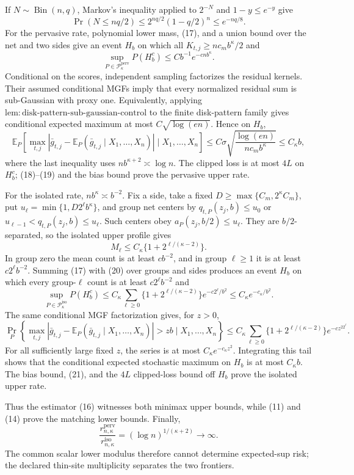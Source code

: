 If \(N\sim\operatorname{Bin}(n,q)\), Markov's inequality applied to \(2^{-N}\) and \(1-y\le e^{-y}\) give
\[
 \Pr(N\le nq/2)\le2^{nq/2}(1-q/2)^n\le e^{-nq/8}. \tag{17}
\]
For the pervasive rate, polynomial lower mass, (17), and a union bound over the net and two sides give an event \(H_b\) on which all \(K_{t,j}\ge nc_mb^\kappa/2\) and
\[
 \sup_{P\in\mathcal P_\kappa^{\mathrm{perv}}}P(H_b^c)
 \le Cb^{-1}e^{-cnb^\kappa}. \tag{18}
\]
Conditional on the scores, independent sampling factorizes the residual kernels.  Their assumed conditional MGFs imply that every normalized residual sum is sub-Gaussian with proxy one.  Equivalently, applying \(\mathrm{lem:disk\text{-}pattern\text{-}sub\text{-}gaussian\text{-}control}\) to the finite disk-pattern family gives conditional expected maximum at most \(C\sqrt{\log(en)}\).  Hence on \(H_b\),
\[
 \mathbb E_P\!\left[
 \max_{t,j}|\bar g_{t,j}-\mathbb E_P(\bar g_{t,j}\mid X_1,\ldots,X_n)|
 \mid X_1,\ldots,X_n\right]
 \le C\sigma\sqrt{\frac{\log(en)}{nc_mb^\kappa}}\le C_\kappa b, \tag{19}
\]
where the last inequality uses \(nb^{\kappa+2}\asymp\log n\).  The clipped loss is at most \(4L\) on \(H_b^c\); (18)--(19) and the bias bound prove the pervasive upper rate.

For the isolated rate, \(nb^\kappa\asymp b^{-2}\).  Fix a side, take a fixed \(D\ge\max\{C_m,2^\kappa C_m\}\), put \(u_\ell=\min\{1,D2^\ell b^\kappa\}\), and group net centers by \(q_{t,P}(z_j,b)\le u_0\) or \(u_{\ell-1}<q_{t,P}(z_j,b)\le u_\ell\).  Such centers obey \(a_P(z_j,b/2)\le u_\ell\).  They are \(b/2\)-separated, so the isolated upper profile gives
\[
 M_\ell\le C_\kappa\{1+2^{\ell/(\kappa-2)}\}. \tag{20}
\]
In group zero the mean count is at least \(cb^{-2}\), and in group \(\ell\ge1\) it is at least \(c2^\ell b^{-2}\).  Summing (17) with (20) over groups and sides produces an event \(H_b\) on which every group-\(\ell\) count is at least \(c2^\ell b^{-2}\) and
\[
 \sup_{P\in\mathcal P_\kappa^{\mathrm{iso}}}P(H_b^c)
 \le C_\kappa\sum_{\ell\ge0}\{1+2^{\ell/(\kappa-2)}\}e^{-c2^\ell/b^2}
 \le C_\kappa e^{-c_\kappa/b^2}. \tag{21}
\]
The same conditional MGF factorization gives, for \(z>0\),
\[
 \Pr_P\!\left\{
 \max_{t,j}|\bar g_{t,j}-\mathbb E_P(\bar g_{t,j}\mid X_1,\ldots,X_n)|>zb
 \mid X_1,\ldots,X_n\right\}
 \le C_\kappa\sum_{\ell\ge0}\{1+2^{\ell/(\kappa-2)}\}e^{-cz^22^\ell}. \tag{22}
\]
For all sufficiently large fixed \(z\), the series is at most \(C_\kappa e^{-c_\kappa z^2}\).  Integrating this tail shows that the conditional expected stochastic maximum on \(H_b\) is at most \(C_\kappa b\).  The bias bound, (21), and the \(4L\) clipped-loss bound off \(H_b\) prove the isolated upper rate.

Thus the estimator (16) witnesses both minimax upper bounds, while (11) and (14) prove the matching lower bounds.  Finally,
\[
 \frac{r_{n,\kappa}^{\mathrm{perv}}}{r_{n,\kappa}^{\mathrm{iso}}}
 =(\log n)^{1/(\kappa+2)}\longrightarrow\infty.
\]
The common scalar lower modulus therefore cannot determine expected-sup risk; the declared thin-site multiplicity separates the two frontiers.
